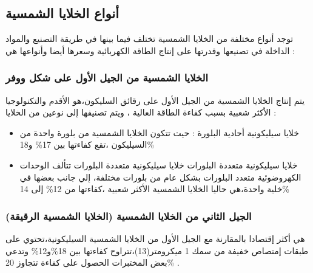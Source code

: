 	\subsection{ أنواع الخلايا الشمسية  }
	توجد أنواع مختلفة من الخلايا الشمسية تختلف فيما بينها في طريقة التصنيع والمواد الداخلة في تصنيعها وقدرتها على إنتاج الطاقة الكهربائية وسعرها أيضا وأنواعها هي :
	
	
	\subsubsection{ الخلايا الشمسية من الجيل الأول على شكل ووفر}
	
	
	يتم إنتاج الخلايا الشمسية من الجيل الأول على رقائق السليكون،هو الأقدم والتكنولوجيا الأكثر شعبية بسبب كفاءة الطاقة العالية ، ويتم تصنيفها إلى نوعين من الخلايا :
	\begin{itemize}
		\item خلايا سيليكونية أحادية البلورة :
		حيت تتكون الخلايا الشمسية من بلورة واحدة من السيليكون ،تقع كفاءتها بين 17\% و18\%
		\item  خلايا سيليكونية متعددة البلورات
		خلايا سيليكونية متعددة البلورات
		تتألف الوحدات الكهروضوئية متعدد البلورات بشكل عام من بلورات مختلفة، إلي جانب بعضها في خلية واحدة،هي حاليا الخلايا الشمسية الأكثر شعبية ،كفاءتها من 12\% إلى 14\%
	\end{itemize}
	\subsubsection{ الجيل الثاني من الخلايا الشمسية (الخلايا الشمسية الرقيقة)}
	
	
	هي أكثر إقتصادا بالمقارنة مع الجيل الأول من الخلايا الشمسية السيليكونية،تحتوي على طبقات إمتصاص خفيفة من سمك 1 ميكرومتر(13)،تتراوح كفاءتها بين 18\%و12\% وتدعي بعض المختبرات الحصول على كفاءة تتجاوز 20\% .
